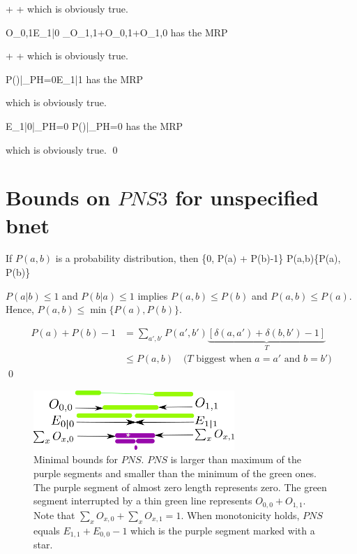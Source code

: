 \beq
{}
\leq
{}
\leq
{}
+
+
\eeq
which is obviously true.

\beq
O_{0,1}\leq E_{1|0} \leq
{}
_{O_{1,1}+O_{0,1}+O_{1,0}}
\eeq
has the MRP

\beq
{}
\leq
{}
\leq
{}
+
+
\eeq
which is obviously true.

\beq
P()|_{PH=0}\leq E_{1|1}
\eeq
has the MRP

\beq
{}
\leq
{}
\eeq
which is obviously true.

\beq
E_{1|0}|_{PH=0}\leq
P()|_{PH=0}
\eeq
has the MRP

\beq
{}
\leq
{}
\eeq
which is obviously true.
\qed



\section{Bounds on $PNS3$ for unspecified bnet}

\begin{claim}\label{cl-basic-bound-joint}
If $P(a,b)$ is a probability
distribution, then
\beq
\max\{0, P(a) + P(b)-1\}\leq
P(a,b)\leq \min\{P(a), P(b)\}
\eeq
\end{claim}
\proof
$P(a|b)\leq 1$
and $P(b|a)\leq 1$
implies $P(a,b)\leq P(b)$
and $P(a,b)\leq P(a)$.
Hence, $P(a,b)\leq \min\{P(a), P(b)\}$.

\begin{align}
P(a) + P(b) -1
&=
\sum_{a', b'} P(a',b')
\underbrace
{[\delta(a,a')+\delta(b,b')
-1]}_{T}
\\
&\leq
P(a,b)\quad
\text{($T$ biggest
when $a=a'$ and $b=b'$)}
\end{align}
\qed


\begin{figure}[h!]
\centering
\includegraphics[width=3in]
{personalized/bounds-minimal.png}
\caption{Minimal bounds
for $PNS$.
$PNS$ is larger
than maximum of the purple segments
and smaller than the
minimum of the green ones.
The purple segment of almost zero
length represents zero.
The green segment
interrupted by a thin green
line represents $O_{0,0} + O_{1,1}$.
Note that $\sum_x O_{x,0}+
\sum_x O_{x,1}=1$. When
monotonicity holds,
$PNS$ equals $E_{1,1}+E_{0,0}-1$
which is the purple
segment marked with a star.
}
\label{fig-bounds-minimal}
\end{figure}

